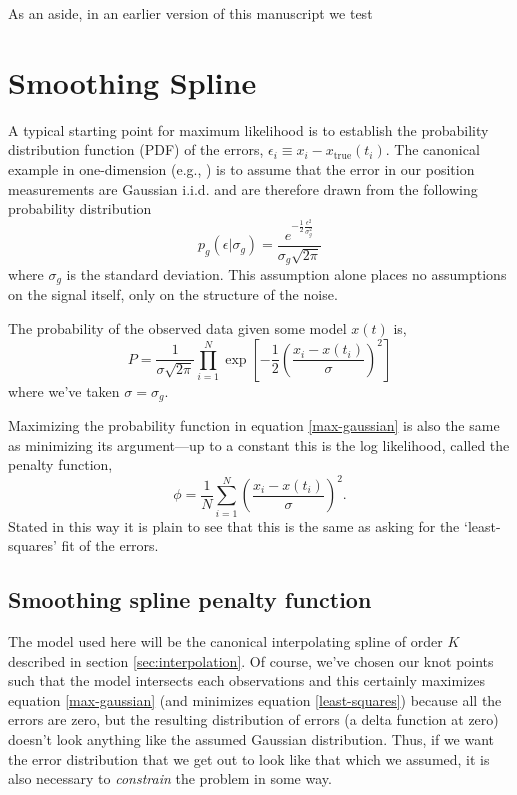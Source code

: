 \documentclass[10pt,journal]{IEEEtran}
\begin{document}
As an aside, in an earlier version of this manuscript we test 

%
\section{Smoothing Spline}
\label{sec:smoothing_spline}
%

A typical starting point for maximum likelihood is to establish the probability distribution function (PDF) of the errors, $\epsilon_i \equiv x_i - x_{\textrm{true}}(t_i)$. The canonical example in one-dimension (e.g., \cite{press1992-book}) is to assume that the error in our position measurements are Gaussian i.i.d. and are therefore drawn from the following probability distribution
\begin{equation}
\label{gaussian_pdf}
p_g(\epsilon|\sigma_g) = \frac{e^{-\frac{1}{2}\frac{\epsilon^2}{\sigma_g^2}} }{\sigma_g \sqrt{ 2 \pi}}
\end{equation}
where $\sigma_g$ is the standard deviation. This assumption alone places no assumptions on the signal itself, only on the structure of the noise.

The probability of the observed data given some model $x(t)$ is,
\begin{equation}
\label{max-gaussian}
P = \frac{1}{\sigma \sqrt{2 \pi}} \prod_{i=1}^{N}  \exp \left[ -\frac{1}{2} \left( \frac{x_i - x(t_i)}{\sigma} \right)^2 \right]
\end{equation}
where we've taken $\sigma=\sigma_g$.

Maximizing the probability function in equation \ref{max-gaussian} is also the same as minimizing its argument---up to a constant this is the log likelihood, called the penalty function,
\begin{equation}
\label{least-squares}
\phi = \frac{1}{N}\sum_{i=1}^{N} \left( \frac{x_i - x(t_i)}{\sigma} \right)^2 .
\end{equation}
Stated in this way it is plain to see that this is the same as asking for the `least-squares' fit of the errors.


\subsection{Smoothing spline penalty function}

The model used here will be the canonical interpolating spline of order $K$ described in section \ref{sec:interpolation}. Of course, we've chosen our knot points such that the model intersects each observations and this certainly maximizes equation \ref{max-gaussian} (and minimizes equation \ref{least-squares}) because all the errors are zero, but the resulting distribution of errors (a delta function at zero) doesn't look anything like the assumed Gaussian distribution. Thus, if we want the error distribution that we get out to look like that which we assumed, it is also necessary to \emph{constrain} the problem in some way.
\end{document}
